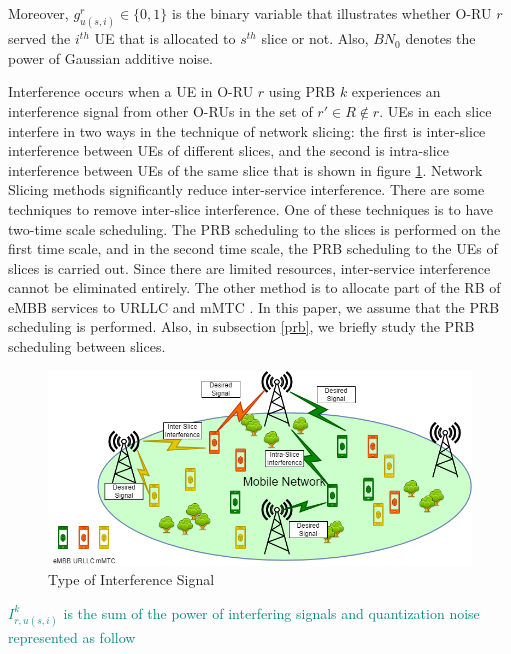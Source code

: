 \documentclass[lettersize,journal]{IEEEtran}
\begin{document}
Moreover, $g_{u(s,i)}^r \in \{0,1\}$ is the binary variable that illustrates whether O-RU $r$ served the $i^{th}$ UE that is allocated to $s^{th}$ slice or not. 
Also, $BN_0$ denotes the power of Gaussian additive noise.

\textcolor{Sepia}{Interference occurs when a UE in O-RU $r$ using PRB $k$ experiences an interference signal from other O-RUs in the set of $r' \in R \not\in
 r$. UEs in each slice interfere in two ways in the technique of network slicing: the first is inter-slice interference between UEs of different slices, and the second is intra-slice interference between UEs of the same slice that is shown in figure \ref{fig:intf}.
Network Slicing methods significantly reduce inter-service interference.
There are some techniques to remove inter-slice interference. One of these techniques is to have two-time scale scheduling. The PRB scheduling to the slices is performed on the first time scale, and in the second time scale, the PRB scheduling to the UEs of slices is carried out. Since there are limited resources, inter-service interference cannot be eliminated entirely. The other method is to allocate part of the RB of eMBB services to URLLC and mMTC \cite{alsenwi2021intelligent, setayesh2020joint, mei2021intelligent}.} In this paper, we assume that the PRB scheduling is performed. Also, in subsection \ref{prb}, we briefly study the PRB scheduling between slices.
\begin{figure}
  \centering 
  \captionsetup{justification=centering}
    \includegraphics[scale = 0.35]{Interference.png}
  \caption{Type of Interference Signal}
  \label{fig:intf}
\end{figure}
\textcolor{teal}{ $I_{r,u(s,i)}^{k}$ is the sum of the power of interfering signals and quantization noise represented as follow}
\end{document}
